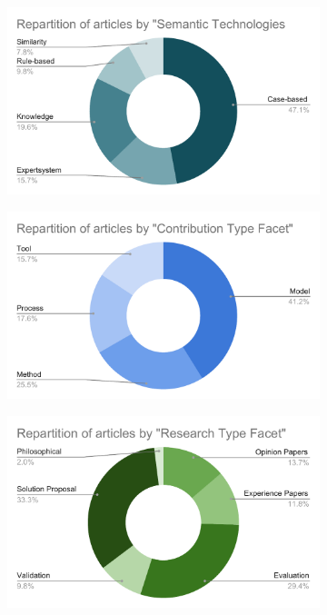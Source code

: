             \begin{figure}[H]
                \centering
                \begin{subfigure}[b]{0.45\textwidth}
                    \centering
                    \includegraphics[width=\textwidth]{images/Repartition_by_Semantic_Technologies_usage.pdf}
                \end{subfigure}
                \begin{subfigure}[b]{0.45\textwidth}
                    \centering
                    \includegraphics[width=\textwidth]{images/Repartition_by_Contribution_Type_Facet.pdf}
                \end{subfigure}
                \begin{subfigure}[b]{0.45\textwidth}
                    \centering
                    \includegraphics[width=\textwidth]{images/Repartition_by _Research_Type_Facet.pdf}

\end{subfigure}
\end{figure}
